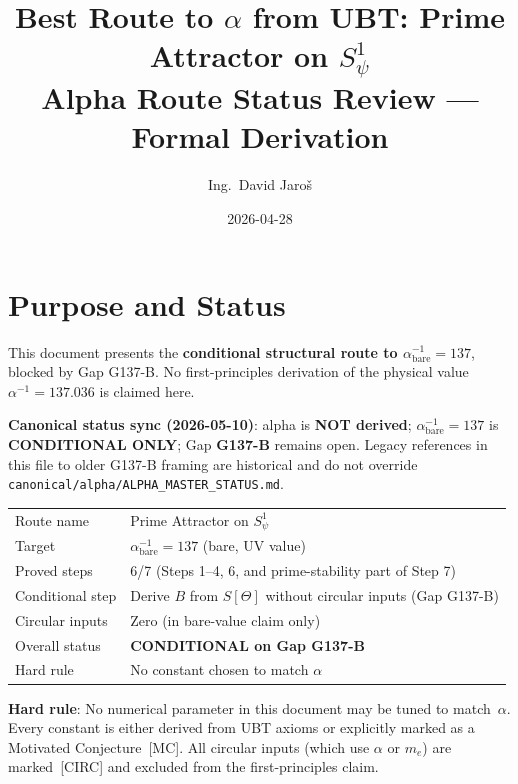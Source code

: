 \documentclass[12pt,a4paper]{article}
\title{\textbf{Best Route to $\alpha$ from UBT: Prime Attractor on $S^1_\psi$}\\
         \large Alpha Route Status Review — Formal Derivation}
\author{Ing.\ David Jaro\v{s}}
\date{2026-04-28}
\theoremstyle{definition}
\theoremstyle{remark}
\begin{document}
  \maketitle
\fi

\section{Purpose and Status}
\label{sec:ar:purpose}

This document presents the \textbf{conditional structural route to
$\alpha^{-1}_{\mathrm{bare}} = 137$}, blocked by Gap G137-B.
No first-principles derivation of the physical value
$\alpha^{-1} = 137.036$ is claimed here.

\begin{warnbox}
\textbf{Canonical status sync (2026-05-10)}:
alpha is \textbf{NOT derived};
$\alpha^{-1}_{\mathrm{bare}} = 137$ is \textbf{CONDITIONAL ONLY};
Gap \textbf{G137-B} remains open.
Legacy references in this file to older G137-B framing are historical and
do not override \texttt{canonical/alpha/ALPHA\_MASTER\_STATUS.md}.
\end{warnbox}

\begin{tcolorbox}[colback=blue!4!white, colframe=blue!50!black,
                  title=Mission Classification]
\begin{tabular}{ll}
Route name & Prime Attractor on $S^1_\psi$ \\
Target & $\alpha^{-1}_{\mathrm{bare}} = 137$ (bare, UV value) \\
Proved steps & 6/7 (Steps 1--4, 6, and prime-stability part of Step 7) \\
Conditional step & Derive $B$ from $S[\Theta]$ without circular inputs (Gap G137-B) \\
Circular inputs & Zero (in bare-value claim only) \\
Overall status & \textbf{CONDITIONAL on Gap G137-B} \\
Hard rule & No constant chosen to match $\alpha$ \\
\end{tabular}
\end{tcolorbox}

\begin{warnbox}
\textbf{Hard rule}: No numerical parameter in this document may be tuned to
match~$\alpha$.  Every constant is either derived from UBT axioms or explicitly
marked as a Motivated Conjecture~[MC].  All circular inputs (which use $\alpha$
or $m_e$) are marked~[CIRC] and excluded from the first-principles claim.
\end{warnbox}
\end{document}
